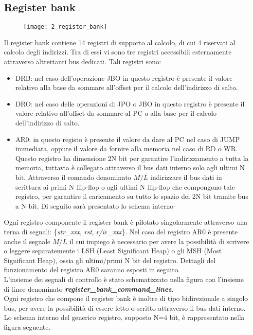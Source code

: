 \subsection{Register bank}
\begin{figure}[H]
	\centering
	\texttt{[image: 2\_register\_bank]}
	\label{fig:register_bank}
\end{figure}
Il register bank contiene 14 registri di supporto al calcolo, di cui 4 riservati al calcolo degli indirizzi. Tra di essi vi sono tre registri accessibili esternamente attraverso altrettanti bus dedicati. Tali registri sono:
\begin{itemize}
	\item DRB: nel caso dell'operazione JBO in questo registro è presente il valore relativo alla base da sommare all'offset per il calcolo dell'indirizzo di salto.
	\item DRO: nel caso delle operazioni di JPO o JBO in questo registro è presente il valore relativo all'offset da sommare al PC o alla base per il calcolo dell'indirizzo di salto.
	\item AR0: in questo registo è presente il valore da dare al PC nel caso di JUMP immediata, oppure il valore da fornire alla memoria nel caso di RD o WR. Questo registro ha dimensione 2N bit per garantire l'indirizzamento a tutta la memoria, tuttavia è collegato attraverso il bus dati interno solo agli ultimi N bit. Attraverso il comando denominato $M/\overline{L}$ indirizzare il bus dati in scrittura ai primi N flip-flop o agli ultimi N flip-flop che compongono tale registro, per garantire il caricamento su tutto lo spazio dei 2N bit tramite bus a N bit. Di seguito sarà presentato lo schema interno-
\end{itemize}
Ogni registro componente il register bank è pilotato singolarmente attraverso una terna di segnali: \{\textit{str\_xxx}, \textit{rst}, \textit{r/$\overline{w}$\_xxx}\}. Nel caso del registro AR0 è presente anche il segnale $M/\overline{L}$ il cui impiego è necessario per avere la possibilità di scrivere o leggere separatemente i LSH (Least Significant Heap) o gli MSH (Most Significant Heap), ossia gli ultimi/primi N bit del registro. Dettagli del funzionamento del registro AR0 saranno esposti in seguito.\\
L'insieme dei segnali di controllo è stato schematizzato nella figura con l'insieme di linee denominato \textit{\textbf{register\_bank\_command\_lines}}.\\
Ogni registro che compone il register bank è inoltre di tipo bidirezionale a singolo bus, per avere la possibilità di essere letto o scritto attraverso il bus dati interno. Lo schema interno del generico registro, supposto N=4 bit, è rappresentato nella figura seguente.

